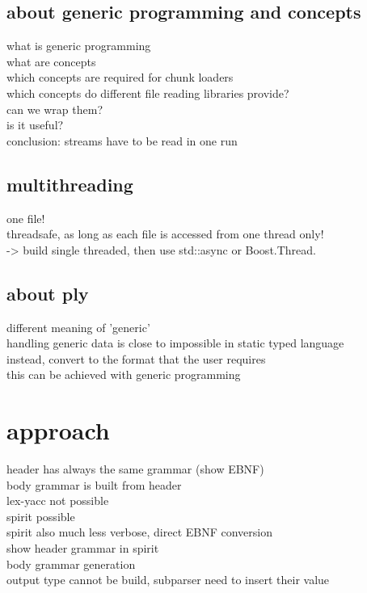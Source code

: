 \documentclass[a4paper,parskip=half]{scrartcl}
\begin{document}
\subsection{about generic programming and concepts}
%
what is generic programming\\
what are concepts\\
which concepts are required for chunk loaders\\
which concepts do different file reading libraries provide?\\
can we wrap them?\\
is it useful?\\
conclusion: streams have to be read in one run\\

\subsection{multithreading}
%
one file!\\
threadsafe, as long as each file is accessed from one thread only!\\
-> build single threaded, then use std::async or Boost.Thread.\\

\subsection{about ply}
different meaning of 'generic'\\
handling generic data is close to impossible in static typed language\\
instead, convert to the format that the user requires\\
this can be achieved with generic programming\\

\section{approach}
%
header has always the same grammar (show EBNF)\\
body grammar is built from header\\
lex-yacc not possible\\
spirit possible\\
spirit also much less verbose, direct EBNF conversion\\
show header grammar in spirit\\
body grammar generation\\
output type cannot be build, subparser need to insert their value\\
\end{document}
